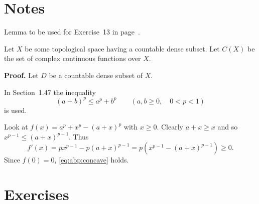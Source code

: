 
\section{Notes}

Lemma to be used for Exercise~13 in page~\pageref{ex:1:13}.

\begin{llem}
Let $X$ be some topological space having a countable dense subset.
Let \(C(X)\) be the set of complex continuous functions over $X$.
\end{llem}
\textbf{Proof.}
Let $D$ be a countable dense subset of $X$.
\proofend

In Section~1.47 the inequality
\begin{equation} \label{eq:abp:concave}
(a + b)^p \leq a^p + b^p
\qquad (a,b \geq 0, \quad 0 < p < 1)
\end{equation}
is used. 
\iffalse
It is implied by the convexity of \(t \to t^p\),
see \cite{RudinRCA80} the proof of Theorem~3.5.
\fi

Look at \(f(x) = a^p + x^p - (a + x)^p\) with \(x \geq 0\).
Clearly \(a+x \geq x\) and so \(x^{p-1} \leq (a+x)^{p-1}\).
Thus
\begin{equation*}
f'(x) = px^{p-1} - p(a+x)^{p-1} = p\left(x^{p-1} - (a+x)^{p-1}\right) \geq 0.
\end{equation*}
Since \(f(0) = 0\), \eqref{eq:abp:concave} holds.


\section{Exercises} %

